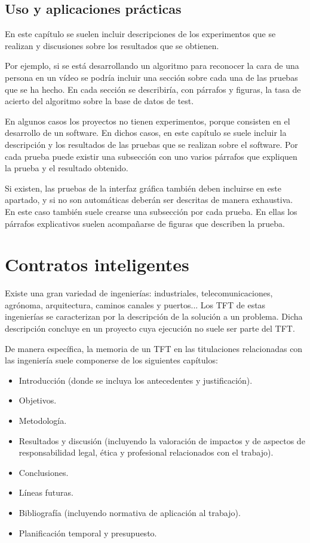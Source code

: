 \documentclass[12pt,spanish,chapterprefix, numbers=noenddot]{book}
\numberwithin{equation}{section}
\numberwithin{figure}{section}
\begin{document}
    \subsection{Uso y aplicaciones prácticas}

    En este capítulo se suelen incluir descripciones de los experimentos
    que se realizan y discusiones sobre los resultados que se obtienen.

    Por ejemplo, si se está desarrollando un algoritmo para reconocer
    la cara de una persona en un vídeo se podría incluir una sección sobre
    cada una de las pruebas que se ha hecho. En cada sección se describiría,
    con párrafos y figuras, la tasa de acierto del algoritmo sobre la
    base de datos de test.

    En algunos casos los proyectos no tienen experimentos, porque consisten
    en el desarrollo de un software. En dichos casos, en este capítulo
    se suele incluir la descripción y los resultados de las pruebas que
    se realizan sobre el software. Por cada prueba puede existir una subsección
    con uno varios párrafos que expliquen la prueba y el resultado obtenido.

    Si existen, las pruebas de la interfaz gráfica también deben incluirse
    en este apartado, y si no son automáticas deberán ser descritas de
    manera exhaustiva. En este caso también suele crearse una subsección
    por cada prueba. En ellas los párrafos explicativos suelen acompañarse
    de figuras que describen la prueba.



    \section{Contratos inteligentes}

    Existe una gran variedad de ingenierías: industriales, telecomunicaciones,
    agrónoma, arquitectura, caminos canales y puertos... Los TFT de estas
    ingenierías se caracterizan por la descripción de la solución a un
    problema. Dicha descripción concluye en un proyecto cuya ejecución
    no suele ser parte del TFT.

    De manera específica, la memoria de un TFT en las titulaciones relacionadas
    con las ingeniería suele componerse de los siguientes capítulos:
    \begin{itemize}
        \item Introducción (donde se incluya los antecedentes y justificación).
        \item Objetivos.
        \item Metodología.
        \item Resultados y discusión (incluyendo la valoración de impactos y de
        aspectos de responsabilidad legal, ética y profesional relacionados
        con el trabajo).
        \item Conclusiones.
        \item Líneas futuras.
        \item Bibliografía (incluyendo normativa de aplicación al trabajo).
        \item Planificación temporal y presupuesto.
    \end{itemize}
\end{document}
